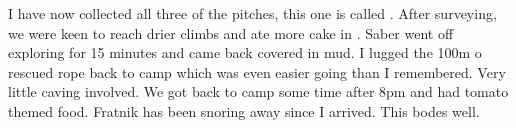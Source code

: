 I have now collected all three of the  pitches, this one is called . After surveying, we were keen to reach drier climbs and ate more cake in . Saber went off exploring for 15 minutes and came back covered in mud. I lugged the 100m o rescued rope back to camp which was even easier going than I remembered. Very little caving involved. We got back to camp some time after 8pm and had tomato themed food. Fratnik has been snoring away since I arrived. This bodes well.



